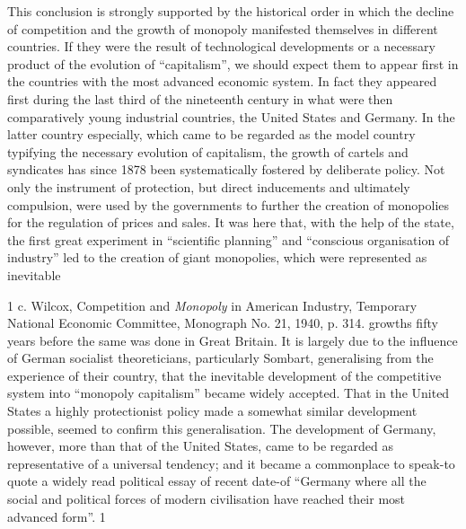 \documentclass[11pt,openany]{book}
\begin{document}
This conclusion is strongly supported by the historical order in which the decline of competition and the growth of monopoly manifested themselves in different countries. If they were the result of technological developments or a necessary product of the evolution of ``capitalism'', we should expect them to appear first in the countries with the most advanced economic system. In fact they appeared first during the last third of the nineteenth century in what were then comparatively young industrial countries, the United States and Germany. In the latter country especially, which came to be regarded as the model country typifying the necessary evolution of capitalism, the growth of cartels and syndicates has since 1878 been systematically fostered by deliberate policy. Not only the instrument of protection, but direct inducements and ultimately compulsion, were used by the governments to further the creation of monopolies for the regulation of prices and sales. It was here that, with the help of the state, the first great experiment in ``scientific planning'' and ``conscious organisation of industry'' led to the creation of giant monopolies, which were represented as inevitable

1 c. Wilcox, Competition and \emph{Monopoly} in American Industry, Temporary National Economic Committee, Monograph No. 21, 1940, p. 314. growths fifty years before the same was done in Great Britain. It is largely due to the influence of German socialist theoreticians, particularly Sombart, generalising from the experience of their country, that the inevitable development of the competitive system into ``monopoly capitalism'' became widely accepted. That in the United States a highly protectionist policy made a somewhat similar development possible, seemed to confirm this generalisation. The development of Germany, however, more than that of the United States, came to be regarded as representative of a universal tendency; and it became a commonplace to speak-to quote a widely read political essay of recent date-of ``Germany where all the social and political forces of modern civilisation have reached their most advanced form''. 1
\end{document}
